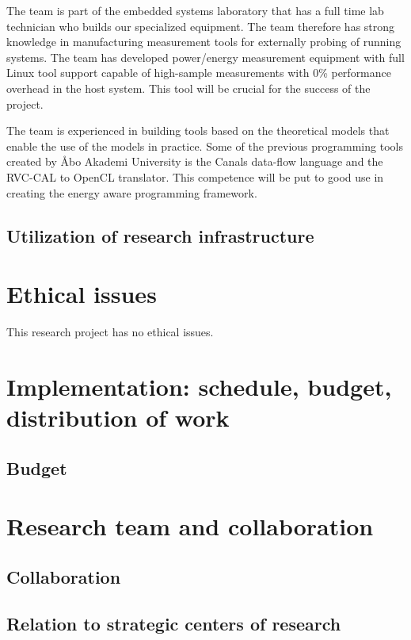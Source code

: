 \documentclass{article}
\begin{document}
The team is part of the embedded systems laboratory that has a full time lab technician who builds our specialized equipment. 
The team therefore has strong knowledge in manufacturing measurement tools for externally probing of running systems. 
The team has developed power/energy measurement equipment with full Linux tool support capable of high-sample measurements with 0\% performance overhead in the host system. 
This tool will be crucial for the success of the project.

The team is experienced in building tools based on the theoretical models that enable the use of the models in practice. 
Some of the previous programming tools created by \AA{}bo Akademi University is the Canals data-flow language and the RVC-CAL to OpenCL translator. 
This competence will be put to good use in creating the energy aware programming framework.

\subsection{Utilization of research infrastructure}

\section{Ethical issues}
This research project has no ethical issues.

\section{Implementation: schedule, budget, distribution of work}

\subsection{Budget}

\section{Research team and collaboration}

\subsection{Collaboration}

\subsection{Relation to strategic centers of research}
\end{document}
